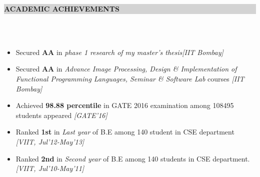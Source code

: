 \documentclass[a4paper,10pt]{article}
\newcommand{\lsep}{-0.5cm}
\newcommand{\resheading}[1]{{\small \colorbox{lightgray}{\begin{minipage}{1\textwidth}{\textbf{#1 \vphantom{p\^{E}}}}\end{minipage}}}}
\begin{document}
\hspace{-0.5cm}
\resheading{\textbf{\large ACADEMIC ACHIEVEMENTS }}\\[\lsep] 
\\[-0.4cm]
   \begin{itemize}
    \item Secured \textbf{AA} in \textit{phase 1 research of my master's thesis}\hfill\emph{[IIT Bombay]} \\[-0.7cm]  
    \item Secured \textbf{AA} in \textit{Advance Image Processing, Design \& Implementation of Functional Programming Languages, Seminar \& Software Lab } courses \hfill\emph{[IIT Bombay]} \\[-0.7cm]  
    \item Achieved \textbf{98.88 percentile} in GATE 2016 examination among 108495 students appeared \hfill\emph{[GATE'16]} \\[-0.7cm]
    \item Ranked \textbf{1st} in \textit{Last year} of B.E among 140 student in CSE department \hfill\emph{[VIIT, Jul'12-May'13]} \\[-0.7cm]
  \item Ranked \textbf{2nd} in \textit{Second year} of B.E among 140 students in CSE department. \hfill\emph{[VIIT, Jul'10-May'11]} \\[-0.5cm]
   \end{itemize}
\end{document}
